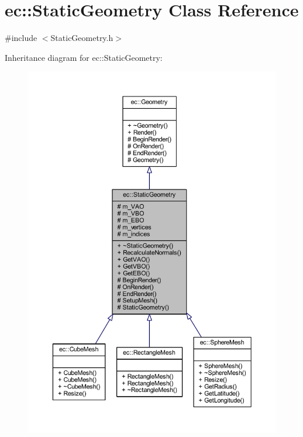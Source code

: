 \hypertarget{classec_1_1_static_geometry}{}\section{ec\+:\+:Static\+Geometry Class Reference}
\label{classec_1_1_static_geometry}


{\ttfamily \#include $<$Static\+Geometry.\+h$>$}



Inheritance diagram for ec\+:\+:Static\+Geometry\+:
\nopagebreak
\begin{figure}[H]
\begin{center}
\leavevmode
\includegraphics[width=350pt]{classec_1_1_static_geometry__inherit__graph}
\end{center}
\end{figure}


